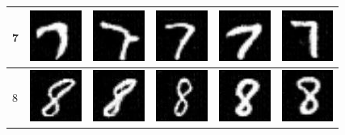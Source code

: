 \begin{table}[ht]
\begin{tabular}{|llllll|}
7 & \includegraphics[width=1.69cm, height=1.69cm]{Files/MNIST/0-7.png}  &\includegraphics[width=1.69cm, height=1.69cm]{Files/MNIST/2-1.png}   & \includegraphics[width=1.69cm, height=1.69cm]{Files/MNIST/3-3.png}  & \includegraphics[width=1.69cm, height=1.69cm]{Files/MNIST/4-5.png}  & \includegraphics[width=1.69cm, height=1.69cm]{Files/MNIST/5-7.png} \\ \hline

8 & \includegraphics[width=1.69cm, height=1.69cm]{Files/MNIST/1-0.png}  &\includegraphics[width=1.69cm, height=1.69cm]{Files/MNIST/2-2.png}   & \includegraphics[width=1.69cm, height=1.69cm]{Files/MNIST/3-4.png}  & \includegraphics[width=1.69cm, height=1.69cm]{Files/MNIST/4-6.png}  & \includegraphics[width=1.69cm, height=1.69cm]{Files/MNIST/7-2.png} \\ \hline


\end{tabular}
\end{table}
